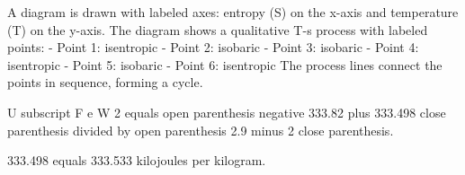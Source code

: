 A diagram is drawn with labeled axes: entropy (S) on the x-axis and temperature (T) on the y-axis. The diagram shows a qualitative T-s process with labeled points:  
- Point 1: isentropic  
- Point 2: isobaric  
- Point 3: isobaric  
- Point 4: isentropic  
- Point 5: isobaric  
- Point 6: isentropic  
The process lines connect the points in sequence, forming a cycle.

U subscript F e W 2 equals open parenthesis negative 333.82 plus 333.498 close parenthesis divided by open parenthesis 2.9 minus 2 close parenthesis.  

333.498 equals 333.533 kilojoules per kilogram.